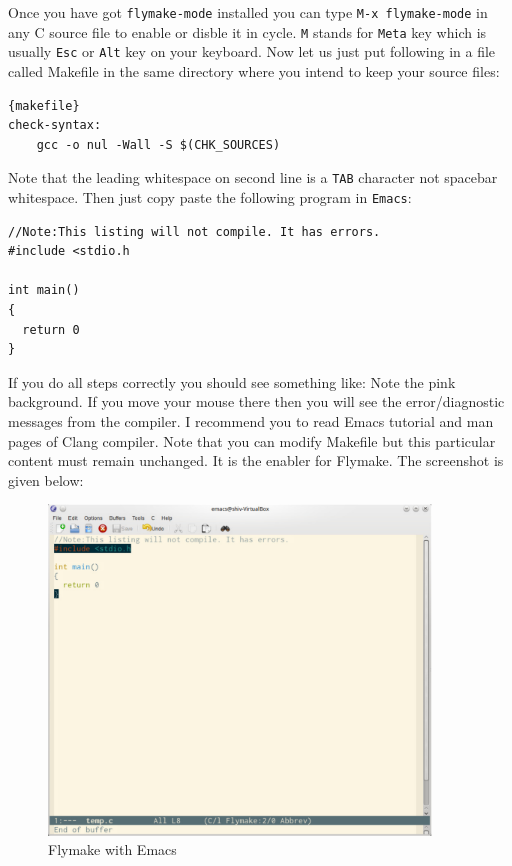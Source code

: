 Once you have got \texttt{flymake-mode} installed you can type \texttt{M-x
  flymake-mode} in any C source file to enable or disble it in
cycle. \texttt{M} stands for \texttt{Meta} key which is usually \texttt{Esc} or
\texttt{Alt} key on your keyboard. Now let us just put following in a file
called Makefile in the same directory where you intend to keep your source
files:

\begin{Verbatim}[frame=single]{makefile}
check-syntax:
    gcc -o nul -Wall -S $(CHK_SOURCES)
\end{Verbatim}


Note that the leading whitespace on second line is a \texttt{TAB} character not
spacebar whitespace. Then just copy paste the following program in
\texttt{Emacs}:

\begin{Verbatim}[frame=single]
//Note:This listing will not compile. It has errors.
#include <stdio.h

int main()
{
  return 0
}
\end{Verbatim}

If you do all steps correctly you should see something like: Note the pink
background. If you move your mouse there then you will see the error/diagnostic
messages from the compiler. I recommend you to read Emacs tutorial and
man pages of Clang compiler. Note that you can modify Makefile but this
particular content must remain unchanged. It is the enabler for Flymake. The
screenshot is given below:

\begin{figure}[t!]
\begin{center}
\includegraphics[width=4in]{figs/flymake.pdf}
\end{center}
\caption{Flymake with Emacs}
\end{figure}

